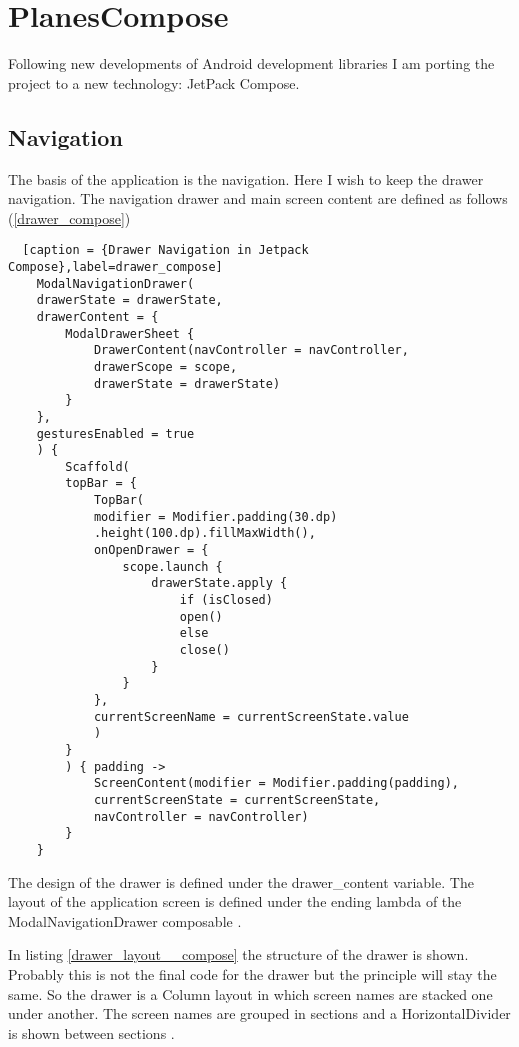 \section{PlanesCompose}

Following new developments of Android development libraries I am porting the project to a new technology: JetPack Compose. 

\subsection{Navigation}

The basis of the application is the navigation. Here I wish to keep the drawer navigation. 
The navigation drawer and main screen content are defined as follows (\ref{drawer_compose})

\begin{lstlisting}  [caption = {Drawer Navigation in Jetpack Compose},label=drawer_compose]
	ModalNavigationDrawer(
	drawerState = drawerState,
	drawerContent = {
		ModalDrawerSheet {
			DrawerContent(navController = navController,
			drawerScope = scope,
			drawerState = drawerState)
		}
	},
	gesturesEnabled = true
	) {
		Scaffold(
		topBar = {
			TopBar(
			modifier = Modifier.padding(30.dp)
			.height(100.dp).fillMaxWidth(),
			onOpenDrawer = {
				scope.launch {
					drawerState.apply {
						if (isClosed)
						open()
						else
						close()
					}
				}
			},
			currentScreenName = currentScreenState.value
			)
		}
		) { padding ->
			ScreenContent(modifier = Modifier.padding(padding),
			currentScreenState = currentScreenState,
			navController = navController)
		}
	}
\end{lstlisting}

The design of the drawer is defined under the drawer\_content variable. The layout of the application screen is defined under the ending lambda of the ModalNavigationDrawer composable . 

In listing \ref{drawer_layout__compose} the structure of the drawer is shown. Probably this is not the final code for the drawer but the principle will stay the same. So the drawer is a Column layout in which screen names are stacked one under another. The screen names are grouped in sections and a HorizontalDivider is shown between sections .

